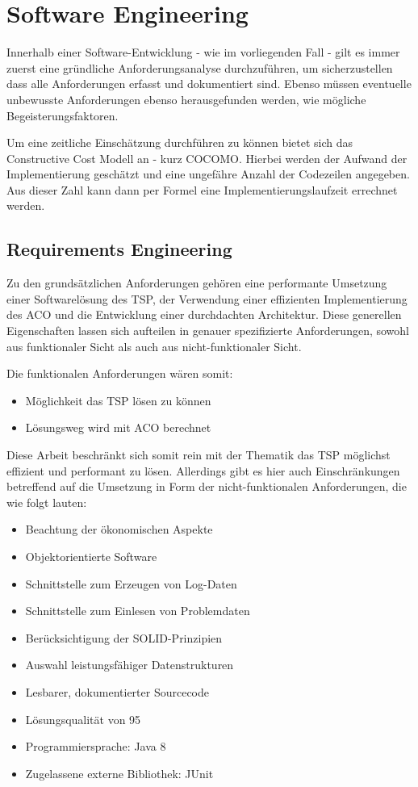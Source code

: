 \section{Software Engineering}{
Innerhalb einer Software-Entwicklung - wie im vorliegenden Fall - gilt es immer zuerst eine gründliche Anforderungsanalyse durchzuführen, um sicherzustellen dass alle Anforderungen erfasst und dokumentiert sind. Ebenso müssen eventuelle unbewusste Anforderungen ebenso herausgefunden werden, wie mögliche Begeisterungsfaktoren.

Um eine zeitliche Einschätzung durchführen zu können bietet sich das Constructive Cost Modell an - kurz COCOMO. Hierbei werden der Aufwand der Implementierung geschätzt und eine ungefähre Anzahl der Codezeilen angegeben. Aus dieser Zahl kann dann per Formel eine Implementierungslaufzeit errechnet werden. 

	\subsection{Requirements Engineering}
	Zu den grundsätzlichen Anforderungen gehören eine performante Umsetzung einer Softwarelösung des TSP, der Verwendung einer effizienten Implementierung des ACO und die Entwicklung einer durchdachten Architektur.
	Diese generellen Eigenschaften lassen sich aufteilen in genauer spezifizierte Anforderungen, sowohl aus funktionaler Sicht als auch aus nicht-funktionaler Sicht.
	
	Die funktionalen Anforderungen wären somit:
	\begin{itemize}
		\item Möglichkeit das TSP lösen zu können
		\item Lösungsweg wird mit ACO berechnet
	\end{itemize}
	Diese Arbeit beschränkt sich somit rein mit der Thematik das TSP möglichst effizient und performant zu lösen. Allerdings gibt es hier auch Einschränkungen betreffend auf die Umsetzung in Form der nicht-funktionalen Anforderungen, die wie folgt lauten:		
	\begin{itemize}
		\item Beachtung der ökonomischen Aspekte
		\item Objektorientierte Software
		\item Schnittstelle zum Erzeugen von Log-Daten
		\item Schnittstelle zum Einlesen von Problemdaten
		\item Berücksichtigung der SOLID-Prinzipien
		\item Auswahl leistungsfähiger Datenstrukturen
		\item Lesbarer, dokumentierter Sourcecode
		\item Lösungsqualität von 95%
		\item Programmiersprache: Java 8
		\item Zugelassene externe Bibliothek: JUnit
	\end{itemize}
	
}
